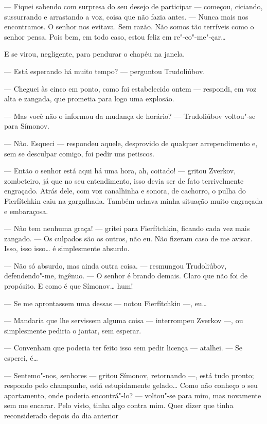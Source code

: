 --- Fiquei sabendo com surpresa do seu desejo de participar --- começou,
ciciando, sussurrando e arrastando a voz, coisa que não fazia antes. ---
Nunca mais nos encontramos. O senhor nos evitava. Sem razão. Não somos
tão terríveis como o senhor pensa. Pois bem, em todo caso, estou feliz
em re"-co"-me"-çar\ldots{}

E se virou, negligente, para pendurar o chapéu na janela.

--- Está esperando há muito tempo? --- perguntou Trudoliúbov.

--- Cheguei às cinco em ponto, como foi estabelecido ontem --- respondi, em
voz alta e zangada, que prometia para logo uma explosão.

--- Mas você não o informou da mudança de horário? --- Trudoliúbov voltou"-se
para Símonov.

--- Não. Esqueci --- respondeu aquele, desprovido de qualquer
arrependimento e, sem se desculpar comigo, foi pedir uns petiscos.

--- Então o senhor está aqui há uma hora, ah, coitado! --- gritou Zverkov,
zombeteiro, já que no seu entendimento, isso devia ser de fato
terrivelmente engraçado. Atrás dele, com voz canalhinha e sonora, de
cachorro, o pulha do Fierfítchkin caiu na gargalhada. Também achava
minha situação muito engraçada e embaraçosa.

--- Não tem nenhuma graça! --- gritei para Fierfítchkin, ficando cada vez
mais zangado. --- Os culpados são os outros, não eu. Não fizeram caso de
me avisar. Isso, isso isso\ldots{} é simplesmente absurdo.

--- Não só absurdo, mas ainda outra coisa. --- resmungou Trudoliúbov,
defendendo"-me, ingênuo. --- O senhor é brando demais. Claro que não foi de
propósito. E como é que Símonov\ldots{} hum!

--- Se me aprontassem uma dessas --- notou Fierfítchkin ---, eu\ldots{}

--- Mandaria que lhe servissem alguma coisa --- interrompeu Zverkov ---, ou
simplesmente pediria o jantar, sem esperar.

--- Convenham que poderia ter feito isso sem pedir licença --- atalhei. ---
Se esperei, é\ldots{}

--- Sentemo"-nos, senhores --- gritou Símonov, retornando ---, está tudo
pronto; respondo pelo champanhe, está estupidamente gelado\ldots{} Como não
conheço o seu apartamento, onde poderia encontrá"-lo? --- voltou"-se para
mim, mas novamente sem me encarar. Pelo visto, tinha algo contra mim.
Quer dizer que tinha reconsiderado depois do dia anterior

